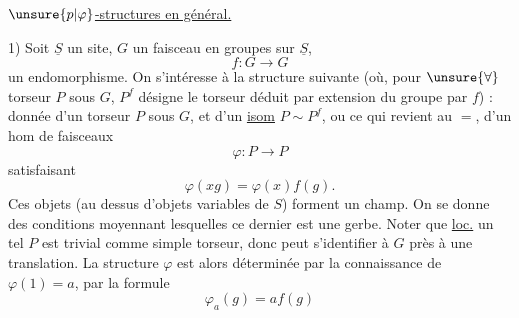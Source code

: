 \uline{$\unsure{p|\varphi}$-structures en général.}

1) Soit $\underline S$ un site, $G$ un faisceau en groupes sur $\underline S$,
\[
f:G\longrightarrow G
\]
un endomorphisme. On s'intéresse à la structure
suivante (où, pour $\unsure{\forall}$ torseur $P$ sous $G$,
$P^f$ désigne le torseur déduit par extension du
groupe par $f$) : donnée d'un torseur $P$
sous $G$, et d'un \uline{isom} $P\sim P^f$, ou ce qui
revient au $=$, d'un hom de faisceaux
\[
\varphi:P\longrightarrow P
\]
satisfaisant
\[
\varphi(xg)=\varphi(x)f(g).
\]
Ces objets (au dessus d'objets variables de $S$)
forment un champ.
On se donne des conditions
moyennant lesquelles ce dernier est une gerbe.
Noter que \uline{loc.} un tel $P$ est trivial comme
simple torseur, donc peut s'identifier à $G$ près
à une translation. La structure $\varphi$ est alors
déterminée par la connaissance de $\varphi(1)=a$,
par la formule
\[
\varphi_a(g)=a f(g)
\]
